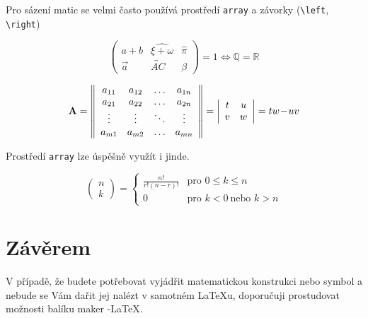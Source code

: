 \documentclass[11pt, a4paper, twocolumn]{article}
\theoremstyle{definition}
\begin{document}
Pro sázení matic se velmi často používá prostředí \verb|array| a závorky (\verb|\left|, \verb|\right|) \par

\[ \left( \begin{array}{ccc}
a+b & \widehat{\xi + \omega} & \hat{\pi} \\
\vec{a} & \overleftrightarrow{AC} & \beta \end{array} \right)= 1 \Longleftrightarrow \mathbb{Q} = \mathbb{R} \] 

\[
\mbox{\textbf{A}} = \left\| \begin{array}{cccc}
 a_{11} & a_{12} & \ldots & a_{1n} \\
 a_{21} & a_{22} & \ldots & a_{2n} \\ 
 \vdots & \vdots & \ddots & \vdots \\
 a_{m1} & a_{m2} & \ldots & a_{mn} 
 \end{array} \right\| 
 = \left| \begin{array}{cc} 
 t & u \\ 
 v & w 
 \end{array} \right|
 = tw\!-\!uv
\]

Prostředí \verb|array| lze úspěšně využít i jinde.

\[ 
\left(\! \begin{array}{c} 
 n  \\ 
 k 
 \end{array} \!\right) 
 = \left\{ \begin{array}{ll}
 \frac{n!}{r!(n-r)!} & \text{pro } 0 \leq k \leq n \\
 0 & \text{pro } k < 0\  \text{nebo }k > n
\end{array} \right.
\] 
 
 \section{Závěrem}

V případě, že budete potřebovat vyjádřit matematickou
konstrukci nebo symbol a nebude se Vám dařit jej nalézt
v samotném \LaTeX u, doporučuji prostudovat možnosti balíku
maker  \AmS-\LaTeX.
\end{document}
